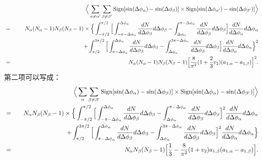 \begin{eqnarray}
& &\Big\langle\sum_{\alpha\neq\alpha'}\sum_{\beta\neq\beta'} {\rm Sign}[\sin(\Delta\phi_\alpha)-\sin(\Delta\phi_\beta)]\times{\rm Sign}[\sin(\Delta\phi_{\alpha'})-\sin(\Delta\phi_{\beta'})]\Big\rangle  \nonumber \\
&=& N_\alpha(N_\alpha-1)N_\beta(N_\beta-1)\times
\Big\{
\int_{-\pi/2}^{\pi/2} 
\Big[\int_{-\pi-\Delta\phi_\alpha}^{\Delta\phi_\alpha} \frac{dN}{d\Delta\phi_\beta}d\Delta\phi_\beta-\int^{\pi-\Delta\phi_\alpha}_{\Delta\phi_\alpha} \frac{dN}{d\Delta\phi_\beta}d\Delta\phi_\beta\Big]\frac{dN}{d\Delta\phi_\alpha}d\Delta\phi_\alpha \nonumber \\
&  & \:\:\:\:\:\:\:\:\:\:\:\:\:\:\:\:\:\:\:\:\:\:\:\:\:\:\:\:\:\:\:\:\:\:\:\:\:\:\:\:\:\:\:\:\:\:\:\:\:\:\:\:\:\: +\int_{\pi/2}^{3\pi/2}
\Big[\int_{\pi-\Delta\phi_\alpha}^{\Delta\phi_\alpha} \frac{dN}{d\Delta\phi_\beta}d\Delta\phi_\beta-\int^{3\pi-\Delta\phi_\alpha}_{\Delta\phi_\alpha} \frac{dN}{d\Delta\phi_\beta}d\Delta\phi_\beta\Big]\frac{dN}{d\Delta\phi_\alpha}d\Delta\phi_\alpha
\Big\}^2 \nonumber \\
&=& N_\alpha(N_\alpha-1)N_\beta(N_\beta-1)\Big[\frac{8}{\pi^2}(1+\frac{2}{3}v_2)(a_{1,\alpha}-a_{1,\beta}) \Big]^2.
\label{eq:A3}
\end{eqnarray}
第二项可以写成：
\begin{eqnarray}
& &\Big\langle\sum_{\alpha}\sum_{\beta\neq\beta'} {\rm Sign}[\sin(\Delta\phi_\alpha)-\sin(\Delta\phi_\beta)]\times{\rm Sign}[\sin(\Delta\phi_{\alpha})-\sin(\Delta\phi_{\beta'})]\Big\rangle  \nonumber \\
&=& N_\alpha N_\beta(N_\beta-1)\times
\Big\{
\int_{-\pi/2}^{\pi/2} 
\Big[\int_{-\pi-\Delta\phi_\alpha}^{\Delta\phi_\alpha} \frac{dN}{d\Delta\phi_\beta}d\Delta\phi_\beta-\int^{\pi-\Delta\phi_\alpha}_{\Delta\phi_\alpha} \frac{dN}{d\Delta\phi_\beta}d\Delta\phi_\beta\Big]^2\frac{dN}{d\Delta\phi_\alpha}d\Delta\phi_\alpha \nonumber \\
&  & \:\:\:\:\:\:\:\:\:\:\:\:\:\:\:\:\:\:\:\:\:\:\:\:\:\:\:\:\:\:\:\:\:\:\:\: +\int_{\pi/2}^{3\pi/2}
\Big[\int_{\pi-\Delta\phi_\alpha}^{\Delta\phi_\alpha} \frac{dN}{d\Delta\phi_\beta}d\Delta\phi_\beta-\int^{3\pi-\Delta\phi_\alpha}_{\Delta\phi_\alpha} \frac{dN}{d\Delta\phi_\beta}d\Delta\phi_\beta\Big]^2\frac{dN}{d\Delta\phi_\alpha}d\Delta\phi_\alpha
\Big\} \nonumber \\
&=& N_\alpha N_\beta(N_\beta-1)\Big[\frac{1}{3}-\frac{8}{\pi^2}(1+v_2)a_{1,\beta}(a_{1,\alpha}-a_{1,\beta}) \Big].
\label{eq:A4}
\end{eqnarray}
